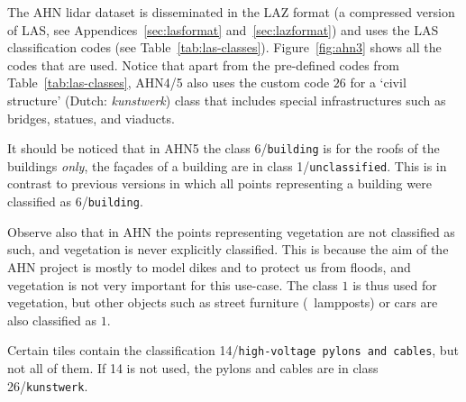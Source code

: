 %

The AHN lidar dataset is disseminated in the LAZ format (a compressed version of LAS, see Appendices~\ref{sec:lasformat} and~\ref{sec:lazformat}) and uses the LAS classification codes (see Table~\ref{tab:las-classes}). 
Figure~\ref{fig:ahn3} shows all the codes that are used. 
Notice that apart from the pre-defined codes from Table~\ref{tab:las-classes}, AHN4/5 also uses the custom code $26$ for a `civil structure' (Dutch: \emph{kunstwerk}) class that includes special infrastructures such as bridges, statues, and viaducts. 

%

It should be noticed that in AHN5 the class 6/\texttt{building} is for the roofs of the buildings \emph{only}, the façades of a building are in class 1/\texttt{unclassified}.
This is in contrast to previous versions in which all points representing a building were classified as 6/\texttt{building}.

%

Observe also that in AHN the points representing vegetation are not classified as such, and vegetation is never explicitly classified.
This is because the aim of the AHN project is mostly to model dikes and to protect us from floods, and vegetation is not very important for this use-case.
The class $1$ is thus used for vegetation, but other objects such as street furniture (\eg\ lampposts) or cars are also classified as $1$.

%

Certain tiles contain the classification 14/\texttt{high-voltage pylons and cables}, but not all of them. 
If 14 is not used, the pylons and cables are in class 26/\texttt{kunstwerk}.

%


